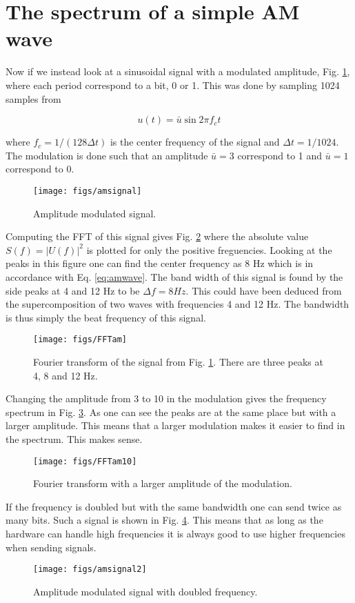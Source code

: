 \section{The spectrum of a simple AM wave}

Now if we instead look at a sinusoidal signal with a modulated amplitude, Fig. \ref{fig:amsignal}, where each period correspond to a bit, 0 or 1. This was done by sampling 1024 samples from

\begin{equation}
\label{eq:amwave}
  u(t) = \bar{u}\sin{2\pi f_c t}
\end{equation}

where $f_c = 1/(128\Delta t)$ is the center frequency of the signal and $\Delta t = 1/1024$. The modulation is done such that an amplitude $\bar{u} = 3$ correspond to 1 and $\bar{u} = 1$ correspond to 0.

\begin{figure}[H]
  \centering
  \texttt{[image: figs/amsignal]}
  \caption{Amplitude modulated signal.}
  \label{fig:amsignal}
\end{figure}

Computing the FFT of this signal gives Fig. \ref{fig:FFTam} where the absolute value $S(f) = |U(f)|^2$ is plotted for only the positive freguencies. Looking at the peaks in this figure one can find the center frequency as 8 Hz which is in accordance with Eq. \eqref{eq:amwave}. The band width of this signal is found by the side peaks at 4 and 12 Hz to be $\Delta f = 8 Hz$. This could have been deduced from the supercomposition of two waves with frequencies 4 and 12 Hz. The bandwidth is thus simply the beat frequency of this signal.

\begin{figure}[H]
  \centering
  \texttt{[image: figs/FFTam]}
  \caption{Fourier transform of the signal from Fig. \ref{fig:amsignal}. There are three peaks at 4, 8 and 12 Hz.}
  \label{fig:FFTam}
\end{figure}

Changing the amplitude from 3 to 10 in the modulation gives the frequency spectrum in Fig. \ref{fig:FFTam10}. As one can see the peaks are at the same place but with a larger amplitude. This means that a larger modulation makes it easier to find in the spectrum. This makes sense.

\begin{figure}[H]
  \centering
  \texttt{[image: figs/FFTam10]}
  \caption{Fourier transform with a larger amplitude of the modulation.}
  \label{fig:FFTam10}
\end{figure}

If the frequency is doubled but with the same bandwidth one can send twice as many bits. Such a signal is shown in Fig. \ref{fig:amsignal2}. This means that as long as the hardware can handle high frequencies it is always good to use higher frequencies when sending signals.

\begin{figure}[H]
  \centering
  \texttt{[image: figs/amsignal2]}
  \caption{Amplitude modulated signal with doubled frequency.}
  \label{fig:amsignal2}
\end{figure}
